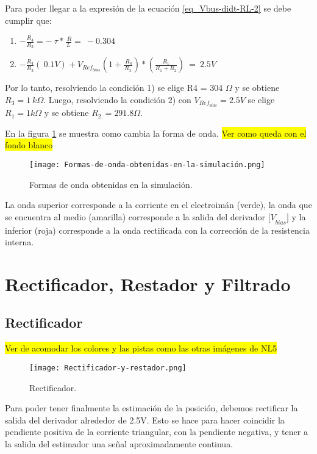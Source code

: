 \noindent Para poder llegar a la expresi\'{o}n de la ecuaci\'{o}n \ref{eq_Vbus-didt-RL-2} se debe cumplir que:

\begin{enumerate}
	\item  $-\frac{R_4}{R_3}=-\ \tau *\frac{\ R}{L}=\ -0.304$  
	
	\item  $-\frac{R_4}{R_3}(\ 0.1V)+V_{Ref_{bias}}(1+\frac{\ R_4}{R_3})*(\frac{R_1}{R_1+R_2})\ =\ 2.5V$     
\end{enumerate}

\noindent Por lo tanto, resolviendo la condici\'{o}n 1) se elige R4 = 304 $\mathit{\Omega}$ y se obtiene $R_3=1\ k\mathit{\Omega}$. Luego, resolviendo la condici\'{o}n 2) con $V_{Ref_{bias}}=2.5V$ se elige $R_1=1k\mathit{\Omega}$ y se obtiene $R_{2\ }=291.8\mathit{\Omega}.$

\noindent En la figura \ref{fig:img_Formas_de_onda_obtenidas_en_la_simulación} se muestra como cambia la forma de onda.
\colorbox{yellow}{Ver como queda con el fondo blanco}
\begin{figure}[H]
	\centering
	\texttt{[image: Formas-de-onda-obtenidas-en-la-simulación.png]}
	\caption{Formas de onda obtenidas en la simulación.}
	\label{fig:img_Formas_de_onda_obtenidas_en_la_simulación}
\end{figure}

\noindent La onda superior corresponde a la corriente en el electroim\'{a}n (verde), la onda que se encuentra al medio (amarilla) corresponde a la salida del derivador ${[V}_{bias}$$]$ y la inferior (roja) corresponde a la onda rectificada con la correcci\'{o}n de la resistencia interna.

\section{Rectificador, Restador y Filtrado}

\subsection{Rectificador}
\colorbox{yellow}{Ver de acomodar los colores y las pistas como las otras imágenes de NL5}
\begin{figure}[H]
	\centering
	\texttt{[image: Rectificador-y-restador.png]}
	\caption{Rectificador.}
	\label{fig:img_Rectificador_y_restador}
\end{figure}

\noindent Para poder tener finalmente la estimaci\'{o}n de la posici\'{o}n, debemos rectificar la salida del derivador alrededor de 2.5V. Esto se hace para hacer coincidir la pendiente positiva de la corriente triangular, con la pendiente negativa, y tener a la salida del estimador una se\~{n}al aproximadamente continua.

